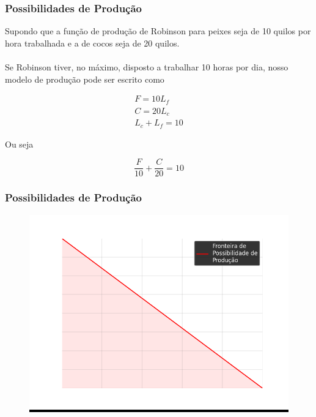 \documentclass{beamer}[10]
\begin{document}
\begin{frame}
	\frametitle{Possibilidades de Produção}

	Supondo que a função de produção de Robinson para peixes seja de 10 quilos por hora trabalhada e a de cocos seja de 20 quilos.
	\\~\\
	Se Robinson tiver, no máximo, disposto a trabalhar 10 horas por dia, nosso modelo de produção pode ser escrito como

	\begin{equation*}
		\begin{split}
			F = 10L_f \\
			C = 20L_c \\
			L_c + L_f = 10
		\end{split}
	\end{equation*}

	Ou seja

	$$\frac{F}{10} + \frac{C}{20} = 10$$

\end{frame}

\begin{frame}
	\frametitle{Possibilidades de Produção}
	
	\begin{figure}[H]
		\centering
		\colorbox{black}{\includegraphics[scale=0.6]{cap33_9-pos_prod1.png}}
	\end{figure}

\end{frame}
\end{document}
